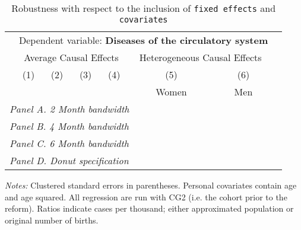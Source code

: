  \begin{table}[H] \begin{threeparttable} \centering \caption{Robustness with respect to the inclusion of \texttt{fixed effects} and \texttt{covariates}} {\def\sym#1{\ifmmode^{#1}\else\(^{#1}\)\fi} \begin{tabular}{l*{7}{c}} \toprule & \multicolumn{6}{c}{Dependent variable: \textbf{Diseases of the circulatory system}} \\ \cmidrule(lr){2-7}
            &\multicolumn{4}{c}{Average Causal Effects}         &\multicolumn{2}{c}{Heterogeneous Causal Effects}\\\cmidrule(lr){2-5}\cmidrule(lr){6-7}
            &\multicolumn{1}{c}{(1)}&\multicolumn{1}{c}{(2)}&\multicolumn{1}{c}{(3)}&\multicolumn{1}{c}{(4)}&\multicolumn{1}{c}{(5)}&\multicolumn{1}{c}{(6)}\\
            &\multicolumn{1}{c}{}&\multicolumn{1}{c}{}&\multicolumn{1}{c}{}&\multicolumn{1}{c}{}&\multicolumn{1}{c}{Women}&\multicolumn{1}{c}{Men}\\
\midrule
 \multicolumn{7}{l}{\emph{Panel A. 2 Month bandwidth}} \\    \midrule\multicolumn{7}{l}{\emph{Panel B. 4 Month bandwidth}} \\    \midrule\multicolumn{7}{l}{\emph{Panel C. 6 Month bandwidth}} \\    \midrule\multicolumn{7}{l}{\emph{Panel D. Donut specification}} \\    \midrule  
\bottomrule \end{tabular} } \begin{tablenotes} \item \scriptsize \emph{Notes:} Clustered standard errors in parentheses. Personal covariates contain age and age squared. All regression are run with CG2 (i.e. the cohort prior to the reform). Ratios indicate cases per thousand; either approximated population or original number of births. \end{tablenotes} \end{threeparttable} \end{table} 
